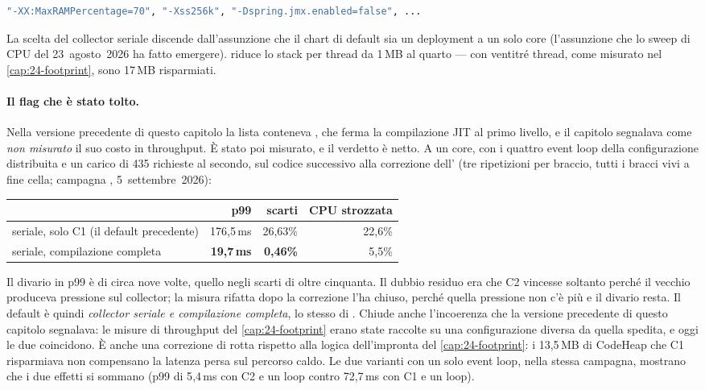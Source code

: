 \begin{lstlisting}[language=bash]
"-XX:MaxRAMPercentage=70", "-Xss256k", "-Dspring.jmx.enabled=false", ...
\end{lstlisting}

La scelta del collector seriale discende dall'assunzione che il chart di
default sia un deployment a un solo core (l'assunzione che lo sweep di CPU del
23~agosto~2026 ha fatto emergere).  riduce lo stack per thread
da 1\,MB al quarto --- con ventitr\'e thread, come misurato nel
\cref{cap:24-footprint}, sono 17\,MB risparmiati.

\paragraph{Il flag che \`e stato tolto.} Nella versione precedente di questo
capitolo la lista conteneva , che ferma la
compilazione JIT al primo livello, e il capitolo segnalava come \emph{non
misurato} il suo costo in throughput. \`E stato poi misurato, e il verdetto \`e
netto. A un core, con i quattro event loop della configurazione distribuita e
un carico di 435 richieste al secondo, sul codice successivo alla correzione
dell' (tre ripetizioni per braccio, tutti i bracci vivi a
fine cella; campagna , 5~settembre~2026):

\begin{center}
\small
\begin{adjustbox}{max width=\textwidth}
\begin{tabular}{@{}lrrr@{}}
\toprule
 & \textbf{p99} & \textbf{scarti} & \textbf{CPU strozzata} \\
\midrule
seriale, solo C1 (il default precedente) & 176{,}5\,ms & 26{,}63\% & 22{,}6\% \\
seriale, compilazione completa & \textbf{19{,}7\,ms} & \textbf{0{,}46\%} & 5{,}5\% \\
\bottomrule
\end{tabular}
\end{adjustbox}
\end{center}

Il divario in p99 \`e di circa nove volte, quello negli scarti di oltre
cinquanta. Il dubbio residuo era che C2 vincesse soltanto perch\'e il vecchio
 produceva pressione sul collector; la misura rifatta dopo
la correzione l'ha chiuso, perch\'e quella pressione non c'\`e pi\`u e il
divario resta. Il default \`e quindi \emph{collector seriale e compilazione
completa}, lo stesso di . Chiude anche
l'incoerenza che la versione precedente di questo capitolo segnalava: le misure
di throughput del \cref{cap:24-footprint} erano state raccolte su una
configurazione diversa da quella spedita, e oggi le due coincidono. \`E anche una
correzione di rotta rispetto alla logica dell'impronta del
\cref{cap:24-footprint}: i 13{,}5\,MB di CodeHeap che C1 risparmiava non
compensano la latenza persa sul percorso caldo. Le due varianti con un solo
event loop, nella stessa campagna, mostrano che i due effetti si sommano (p99 di
5{,}4\,ms con C2 e un loop contro 72{,}7\,ms con C1 e un loop).

